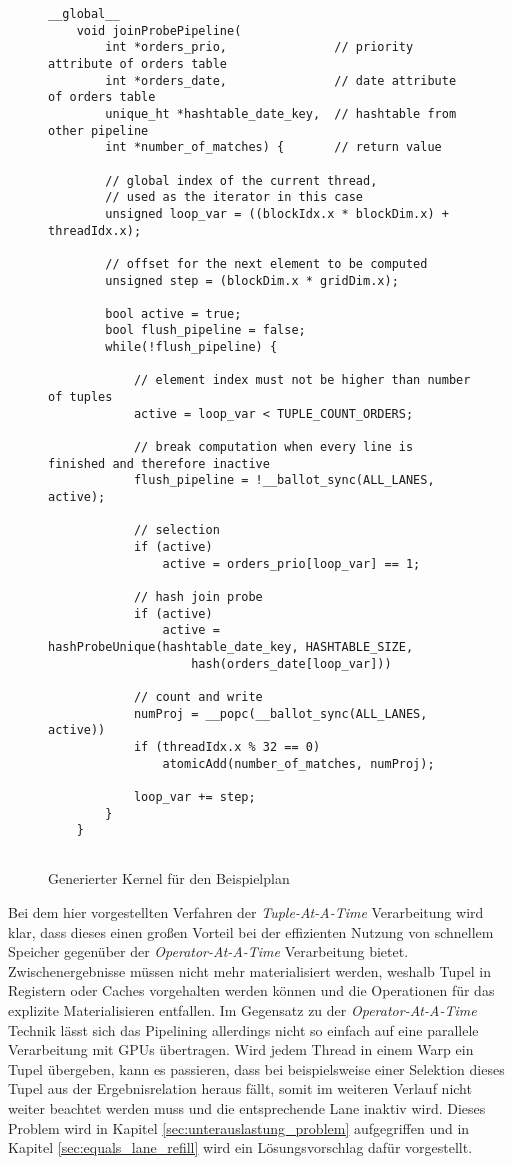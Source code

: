 \begin{figure}[ht]
	\begin{lstlisting}[language=MyC++,
	linebackgroundcolor={%
	\ifnum\value{lstnumber}>24
		\ifnum\value{lstnumber}<28
			\color{red!25}
		\fi
	\fi
	\ifnum\value{lstnumber}>28
		\ifnum\value{lstnumber}<33
			\color{green!25}
		\fi
	\fi
	\ifnum\value{lstnumber}>33
		\ifnum\value{lstnumber}<38
			\color{yellow!25}
		\fi
	\fi
	}]
	__global__
	void joinProbePipeline(
		int *orders_prio,              	// priority attribute of orders table
		int *orders_date,               // date attribute of orders table
		unique_ht *hashtable_date_key,  // hashtable from other pipeline
		int *number_of_matches) {       // return value
		
		// global index of the current thread,
		// used as the iterator in this case
		unsigned loop_var = ((blockIdx.x * blockDim.x) + threadIdx.x);
		
		// offset for the next element to be computed
		unsigned step = (blockDim.x * gridDim.x);
		
		bool active = true;
		bool flush_pipeline = false;
		while(!flush_pipeline) {
		
			// element index must not be higher than number of tuples
			active = loop_var < TUPLE_COUNT_ORDERS;
			
			// break computation when every line is finished and therefore inactive
			flush_pipeline = !__ballot_sync(ALL_LANES, active);
			
			// selection
			if (active)
				active = orders_prio[loop_var] == 1;
			
			// hash join probe
			if (active)
				active = hashProbeUnique(hashtable_date_key, HASHTABLE_SIZE, 
					hash(orders_date[loop_var]))
			
			// count and write
			numProj = __popc(__ballot_sync(ALL_LANES, active))
			if (threadIdx.x % 32 == 0)
				atomicAdd(number_of_matches, numProj);
			
			loop_var += step;
		}
	}
	
	\end{lstlisting}
	\caption{Generierter Kernel für den Beispielplan}
	\label{pipelining_example_code}
\end{figure}

Bei dem hier vorgestellten Verfahren der \emph{Tuple-At-A-Time} Verarbeitung wird klar, dass dieses einen großen Vorteil bei der effizienten Nutzung von schnellem Speicher gegenüber der \emph{Operator-At-A-Time} Verarbeitung bietet.
Zwischenergebnisse müssen nicht mehr materialisiert werden, weshalb Tupel in Registern oder Caches vorgehalten werden können und die Operationen für das explizite Materialisieren entfallen.
Im Gegensatz zu der \emph{Operator-At-A-Time} Technik lässt sich das Pipelining allerdings nicht so einfach auf eine parallele Verarbeitung mit GPUs übertragen.
Wird jedem Thread in einem Warp ein Tupel übergeben, kann es passieren, dass bei beispielsweise einer Selektion dieses Tupel aus der Ergebnisrelation heraus fällt, somit im weiteren Verlauf nicht weiter beachtet werden muss und die entsprechende Lane inaktiv wird.
Dieses Problem wird in Kapitel \ref{sec:unterauslastung_problem} aufgegriffen und in Kapitel \ref{sec:equals_lane_refill} wird ein Lösungsvorschlag dafür vorgestellt.